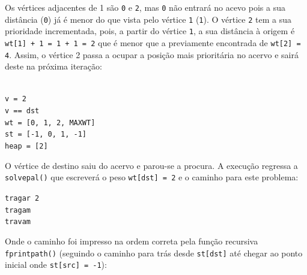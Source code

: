 \documentclass[a4paper, 18pt]{article}
\newcommand\tu[0]{\textunderscore}
\begin{document}
	\par
	Os vértices adjacentes de 1 são \texttt{0} e \texttt{2}, mas \texttt{0} não entrará no acevo pois a sua distância (\texttt{0}) já é menor do que vista pelo vértice \texttt{1} (\texttt{1}). O vértice \texttt{2} tem a sua prioridade incrementada, pois, a partir do vértice \texttt{1}, a sua distância à origem é \texttt{wt[1] + 1 = 1 + 1 = 2} que é menor que a previamente encontrada de \texttt{wt[2] = 4}. Assim, o vértice 2 passa a ocupar a posição mais prioritária no acervo e sairá deste na próxima iteração:
	\begin{center}
		\begin{minipage}{0.45\linewidth}
		\texttt{\\
			v = 2 \\
			v == dst \\
			wt = [0, 1, 2, MAX\tu WT] \\
			st = [-1, 0, 1, -1] \\
			heap = [2] \\}
		\end{minipage}
		\hspace{0.05\linewidth}
	\end{center}
	\par
	O vértice de destino saiu do acervo e parou-se a procura. A execução regressa a \texttt{solve\tu pal()} que escreverá o peso \texttt{wt[dst] = 2} e o caminho para este problema:
	\begin{center}
	\begin{minipage}{0.15\linewidth}
		\texttt{tragar 2 \\
				tragam \\
				travam}
	\end{minipage}
	\end{center}
	\par
	Onde o caminho foi impresso na ordem correta pela função recursiva \texttt{fprint\tu path()} (seguindo o caminho para trás desde \texttt{st[dst]} até chegar ao ponto inicial onde \texttt{st[src] = -1}):
\end{document}
